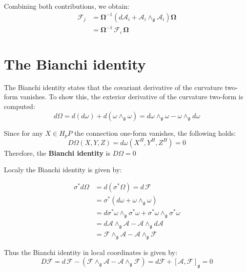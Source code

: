 Combining both contributions, we obtain:
\begin{align*}
  \mathscr{F}_j 
  &= \mathbf{\Omega}^{-1} \left( d\mathbf{\mathcal{A}}_i + \mathbf{\mathcal{A}}_i \wedge_{\mathfrak{g}} \mathbf{\mathcal{A}}_i \right) \mathbf{\Omega} \\
  &= \mathbf{\Omega}^{-1} \, \mathscr{F}_i \, \mathbf{\Omega}
\end{align*}


\section{The Bianchi identity}

The Bianchi identity states that the covariant derivative of the curvature two-form vanishes. To show this, the exterior derivative of the curvature two-form is computed:
\[ d\Omega = d(d\omega) + d(\omega \wedge_\mathfrak{g} \omega) = d\omega \wedge_\mathfrak{g} \omega - \omega \wedge_\mathfrak{g} d\omega  \]

Since for any $X \in H_pP$ the connection one-form vanishes, the following holds:
\[ D\Omega(X,Y,Z) = d\omega(X^H,Y^H,Z^H) = 0 \]
Therefore, the \textbf{Bianchi identity} is \( D\Omega=0 \)

Localy the Bianchi identity is given by:

\begin{align*}
  \sigma^*d\Omega &= d(\sigma^*\Omega) = d\,\mathscr{F} \\
  &= \sigma^*(d\omega + \omega \wedge_\mathfrak{g} \omega) \\
    &= d\sigma^*\omega \wedge_\mathfrak{g} \sigma^*\omega + \sigma^*\omega \wedge_\mathfrak{g} \sigma^*\omega \\
    &= d\mathcal{A} \wedge_\mathfrak{g} \mathcal{A} - \mathcal{A}\wedge_\mathfrak{g}d\mathcal{A} \\
    &= \mathscr{F}\wedge_\mathfrak{g} \mathcal{A} - \mathcal{A} \wedge_\mathfrak{g} \mathscr{F}
\end{align*}

Thus the Bianchi identity in local coordinates is given by:
\[ D\mathscr{F} = d\,\mathscr{F} - (\mathscr{F}\wedge_\mathfrak{g} \mathcal{A} - \mathcal{A} \wedge_\mathfrak{g} \mathscr{F}) = d\mathscr{F} + [\mathcal{A},\mathscr{F}]_\mathfrak{g} = 0 \]
